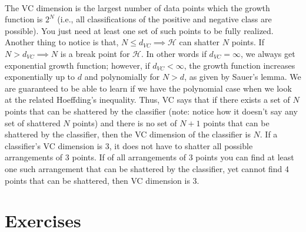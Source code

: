 \begin{flushleft}
	\paragraph[short]{}{The VC dimension is the largest number of data points which the growth function is $2^N$ (i.e., all classifications of the positive and negative class are possible). You just need at least one set of such points to be fully realized. Another thing to notice is that, $N \leq d_{VC} \implies \mathcal{H}$ can shatter $N$ points. If $N > d_{VC} \implies N$ is a break point for $\mathcal{H}$. In other words if $d_{VC} = \infty$, we always get exponential growth function; however, if $d_{VC} < \infty$,
	the growth function increases exponentially up to $d$ and polynomially for $N > d$, as given by Sauer's lemma. We are guaranteed to be able to learn if we have the polynomial case when we look at the related Hoeffding's inequality.
	Thus, VC says that if there exists a set of $N$ points that can be shattered by the classifier (note: notice how it doesn't say any set of shattered $N$ points) and there is no set of $N+1$ points that can be shattered by the classifier, then the VC dimension of the classifier is $N$. If a classifier's VC dimension is 3, it does not have to shatter all possible arrangements of 3 points. If of all arrangements of 3 points you can find at least one such arrangement that can be shattered by the classifier, yet cannot find 4 points that can be shattered, then VC dimension is 3.}

	\section{Exercises}

	\\

\end{flushleft}
